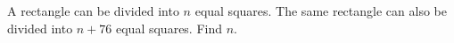 A rectangle can be divided into $n$ equal squares. The same rectangle can also be divided into $n+76$ equal squares. Find $n$.